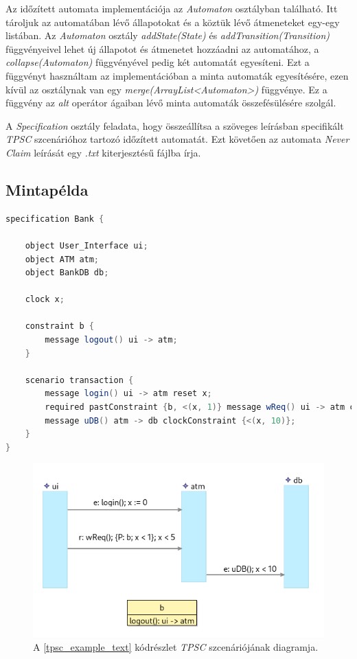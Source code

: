 Az időzített automata implementációja az \textit{Automaton} osztályban található.
Itt tároljuk az automatában lévő állapotokat és a köztük lévő átmeneteket egy-egy listában.
Az \textit{Automaton} osztály \textit{addState(State)} és \textit{addTransition(Transition)} függvényeivel lehet új állapotot és átmenetet hozzáadni az automatához, a \textit{collapse(Automaton)} függvényével pedig két automatát egyesíteni.
Ezt a függvényt használtam az implementációban a minta automaták egyesítésére, ezen kívül az osztálynak van egy \textit{merge(ArrayList<Automaton>)} függvénye.
Ez a függvény az \textit{alt} operátor ágaiban lévő minta automaták összefésülésére szolgál.

A \textit{Specification} osztály feladata, hogy összeállítsa a szöveges leírásban specifikált \textit{TPSC} szcenárióhoz tartozó időzített automatát.
Ezt követően az automata \textit{Never Claim} leírását egy \textit{.txt} kiterjesztésű fájlba írja.

\subsection{Mintapélda}

\begin{lstlisting}[language=java,frame=single, float=h!, caption={\textit{TPSC} szcenárió szöveges leírása.},captionpos=b,label=tpsc_example_text]
specification Bank {

	object User_Interface ui;
	object ATM atm;
	object BankDB db;

	clock x;

	constraint b {
		message logout() ui -> atm;
	}

	scenario transaction {
		message login() ui -> atm reset x;
		required pastConstraint {b, <(x, 1)} message wReq() ui -> atm clockConstraint {<(x, 5)};
		message uDB() atm -> db clockConstraint {<(x, 10)};
	}
}
\end{lstlisting}

\begin{figure}[h!]
    \centering
    \includegraphics[width=130mm, keepaspectratio]{figures/tpsc_automaton_generator_sirius.png}
    \caption{A \ref{tpsc_example_text} kódrészlet \textit{TPSC} szcenáriójának diagramja.}
	\label{tpsc_example_diagram}
\end{figure}

